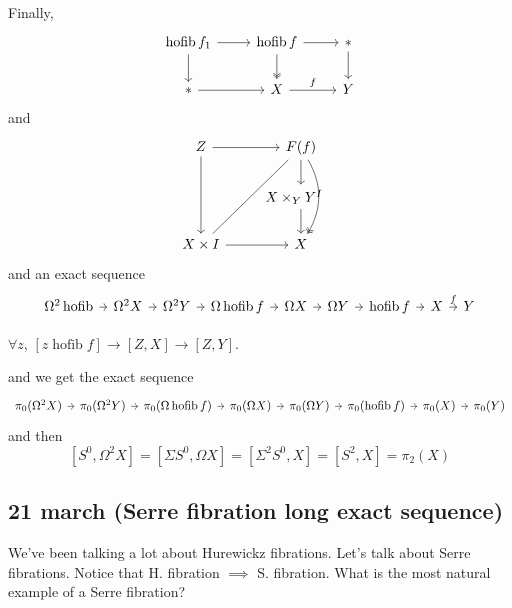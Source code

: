 \documentclass{article}
\numberwithin{equation}{section}
\DeclareMathOperator{\hofib}{hofib}
\begin{document}
Finally,
\[\begin{tikzcd}
	\hofib f_1\arrow[r]\arrow[d]&\hofib f\arrow[d,two heads]\arrow[r]&*\arrow[d]\\
	*\arrow[r]&X\arrow[r,"f"]&Y
\end{tikzcd}\]
and
\[\begin{tikzcd}
	Z\arrow[dd]\arrow[r]&F(f)\arrow[d]\arrow[dd,bend left,two heads]\\
	&X\times_YY^I\quad\arrow[d]\\
	X\times I\arrow[r]\arrow[uur,dash]&X
\end{tikzcd}\]
and an exact sequence
\[\begin{tikzcd}[column sep=tiny]
	\Omega^2\hofib\arrow[r]&\Omega^2X\arrow[r]&\Omega^2Y\arrow[r]&\Omega\hofib f\arrow[r]&\Omega X\arrow[r]&\Omega Y\arrow[r]&\hofib f\arrow[r]&X\arrow[r,"f"]&Y
\end{tikzcd}\]
\begin{lemma}[Exactness]
	$\forall z$, $[z\hofib f]\to[Z,X]\to[Z,Y]$.
\end{lemma}
and we get the exact sequence
\[\begin{tikzcd}[column sep=tiny]
	\pi_0(\Omega^2X)\arrow[r]&\pi_0(\Omega^2Y)\arrow[r]&\pi_0(\Omega\hofib f)\arrow[r]&\pi_0(\Omega X)\arrow[r]&\pi_0(\Omega Y)\arrow[r]&\pi_0(\hofib f)\arrow[r]&\pi_0(X)\arrow[r]&\pi_0(Y)
\end{tikzcd}\]
and then
\[[S^0,\Omega^2X]=[\Sigma S^0,\Omega X]=[\Sigma^2 S^0,X]=[S^2,X]=\pi_2(X)\]


\subsection{21 march (Serre fibration long exact sequence)}

We've been talking a lot about Hurewickz fibrations. Let's talk about Serre fibrations. Notice that H. fibration $\implies$ S. fibration. What is the most natural example of a Serre fibration?
\end{document}
